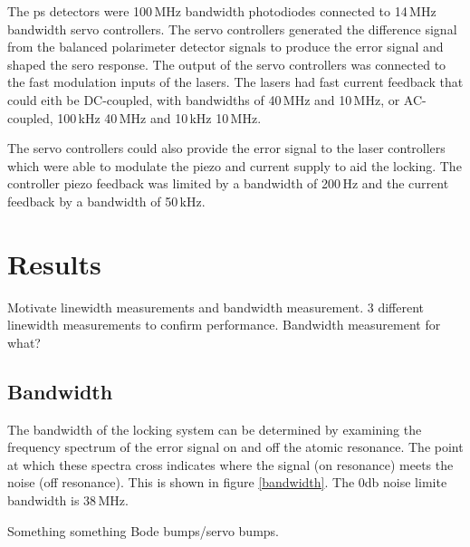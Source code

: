 \documentclass{article}
\begin{document}
\begin{multicols}{2}
The \gls*{ps} detectors were 100\,MHz bandwidth photodiodes\cite{tl_det} connected to 14\,MHz bandwidth servo controllers\cite{nf_servo}. The servo controllers generated the difference signal from the balanced polarimeter detector signals to produce the error signal and shaped the sero response. The output of the servo controllers was connected to the fast modulation inputs of the lasers. The lasers had fast current feedback that could eith be DC-coupled, with bandwidths of 40\,MHz\cite{dl_pro} and 10\,MHz\cite{mog_ecd003}, or AC-coupled, 100\,kHz\,\textendash\,40\,MHz\cite{dl_pro} and 10\,kHz\,\textendash\,10\,MHz\cite{mog_ecd003}.

The servo controllers could also provide the error signal to the laser controllers\cite{mogbox} which were able to modulate the piezo and current supply to aid the locking. The controller piezo feedback was limited by a bandwidth of 200\,Hz and the current feedback by a bandwidth of 50\,kHz.

\section{Results} \label{results_section}


{\color{red}Motivate linewidth measurements and bandwidth measurement. 3 different linewidth measurements to confirm performance. Bandwidth measurement for what?}

\subsection{Bandwidth}

The bandwidth of the locking system can be determined by examining the frequency spectrum of the error signal on and off the atomic resonance. The point at which these spectra cross indicates where the signal (on resonance) meets the noise (off resonance). This is shown in figure \ref{bandwidth}. The 0db noise limite bandwidth is 38\,MHz.

{\color{red}Something something Bode bumps/servo bumps.}


\end{multicols}
\end{document}
